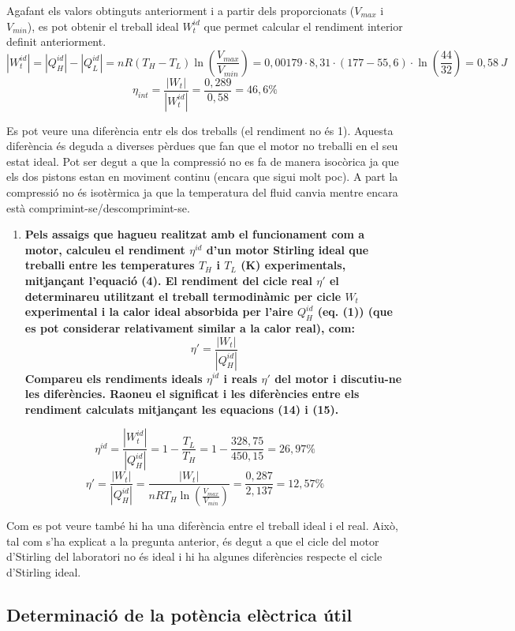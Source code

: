 \documentclass[a4paper]{article}
\begin{document}
Agafant els valors obtinguts anteriorment i a partir dels proporcionats ($V_{max}$ i $V_{min}$), es pot obtenir el treball ideal $W_t^{id}$ que permet calcular el rendiment interior definit anteriorment.
$$
|W_t^{id}| = |Q_H^{id}| - |Q_L^{id}| = 
nR(T_H - T_L)\ln\left(\frac{V_{max}}{V_{min}}\right) = 
0,00179·8,31·(177 - 55,6)·\ln\left(\frac{44}{32}\right) = 0,58\ J
$$
$$
\eta_{int} = \frac{|W_t|}{|W_t^{id}|} = \frac{0,289}{0,58} = 46,6\%
$$

Es pot veure una diferència entr els dos treballs (el rendiment no és 1). Aquesta diferència és deguda a diverses pèrdues que fan que el motor no treballi en el seu estat ideal. Pot ser degut a que la compressió no es fa de manera isocòrica ja que els dos pistons estan en moviment continu (encara que sigui molt poc). A part la compressió no és isotèrmica ja que la temperatura del fluid canvia mentre encara està comprimint-se/descomprimint-se.

\begin{enumerate}[resume]
	\item \textbf{Pels assaigs que hagueu realitzat amb el funcionament com a motor, calculeu el rendiment $\eta^{id}$ d'un motor Stirling ideal que treballi entre les temperatures $T_H$ i $T_L$ (K) experimentals, mitjançant l’equació (4). El rendiment del cicle real $\eta'$ el determinareu utilitzant el treball termodinàmic per cicle $W_t$ experimental i la calor ideal absorbida per l’aire $Q_H^{id}$ (eq. (1)) (que es pot considerar relativament similar a la calor real), com:}
	$$
	\eta'= \frac{|W_t|}{|Q_H^{id}|}
	$$
	\textbf{Compareu els rendiments ideals $\eta^{id}$ i reals $\eta'$ del motor i discutiu-ne les diferències. Raoneu el significat i les diferències entre els rendiment calculats mitjançant les equacions (14) i (15).}
\end{enumerate}

$$
\eta^{id} = \frac{|W_t^{id}|}{|Q_H^{id}|} = 1 - \frac{T_L}{T_H} = 1 - \frac{328,75}{450,15} = 26,97\%
$$
$$
\eta' = \frac{|W_t|}{|Q_H^{id}|} =
\frac{|W_t|}{nRT_H\ln\left(\frac{V_{max}}{V_{min}}\right)} = 
\frac{0,287}{2,137} = 12,57\%
$$

Com es pot veure també hi ha una diferència entre el treball ideal i el real. Això, tal com s'ha explicat a la pregunta anterior, és degut a que el cicle del motor d'Stirling del laboratori no és ideal i hi ha algunes diferències respecte el cicle d'Stirling ideal.

\subsection{Determinació de la potència elèctrica útil}
\end{document}
